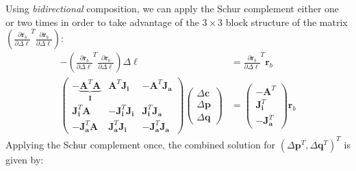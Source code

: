 Using \emph{bidirectional} composition, we can apply the Schur complement either one or two times in order to take advantage of the $3\times3$ block structure of the matrix $\left( \frac{\partial \mathbf{r}_b}{\partial \Delta \boldsymbol{\ell}}^T \frac{\partial \mathbf{r}_b}{\partial \Delta \boldsymbol{\ell}} \right)$:
\begin{equation}
    \begin{aligned}
    	-\left( \frac{\partial \mathbf{r}_b}{\partial \Delta \boldsymbol{\ell}}^T \frac{\partial \mathbf{r}_b}{\partial \Delta \boldsymbol{\ell}} \right) \Delta \boldsymbol{\ell} & = \frac{\partial \mathbf{r}_b}{\partial \Delta \boldsymbol{\ell}}^T \mathbf{r}_b
    	\\
        \left(\begin{array}{c|cc}
            -\underbrace{\mathbf{A}^T \mathbf{A}}_{\mathbf{I}} & \mathbf{A}^T \mathbf{J}_{\mathbf{i}} & -\mathbf{A}^T \mathbf{J}_{\mathbf{a}}
            \\ \hline
            \mathbf{J}_{\mathbf{i}}^T \mathbf{A} & -\mathbf{J}_{\mathbf{i}}^T \mathbf{J}_{\mathbf{i}} & \mathbf{J}_{\mathbf{i}}^T \mathbf{J}_{\mathbf{a}}
            \\
            -\mathbf{J}_{\mathbf{a}}^T \mathbf{A} & \mathbf{J}_{\mathbf{a}}^T \mathbf{J}_{\mathbf{i}} & -\mathbf{J}_{\mathbf{a}}^T \mathbf{J}_{\mathbf{a}}
        \end{array} \right)
        \begin{pmatrix}
            \Delta\mathbf{c}
            \\ \hline
            \Delta\mathbf{p}
            \\
            \Delta\mathbf{q}
        \end{pmatrix}
        & =
        \begin{pmatrix}
            -\mathbf{A}^T
            \\ \hline
            \mathbf{J}_{\mathbf{i}}^T
            \\
            -\mathbf{J}_{\mathbf{a}}^T
        \end{pmatrix} \mathbf{r}_b
    \label{eq:bidirectional_structure}
    \end{aligned}
\end{equation}
Applying the Schur complement once, the combined solution for $(\Delta\mathbf{p}^T, \Delta\mathbf{q}^T)^T$ is given by:
